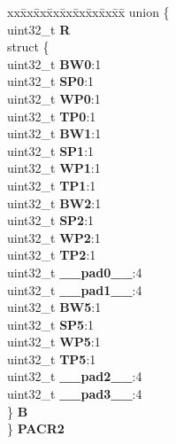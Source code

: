 \begin{DoxyCompactItemize}
\begin{tabbing}
\end{tabbing}\item 
\mbox{\label{structPBRIDGE__B__tag_aef6730ebab74a86ec340a97c2e07ec09}} 
\begin{tabbing}
xx\=xx\=xx\=xx\=xx\=xx\=xx\=xx\=xx\=\kill
union \{\\
\>uint32\_t {\bfseries R}\\
\>struct \{\\
\>\>uint32\_t {\bfseries BW0}:1\\
\>\>uint32\_t {\bfseries SP0}:1\\
\>\>uint32\_t {\bfseries WP0}:1\\
\>\>uint32\_t {\bfseries TP0}:1\\
\>\>uint32\_t {\bfseries BW1}:1\\
\>\>uint32\_t {\bfseries SP1}:1\\
\>\>uint32\_t {\bfseries WP1}:1\\
\>\>uint32\_t {\bfseries TP1}:1\\
\>\>uint32\_t {\bfseries BW2}:1\\
\>\>uint32\_t {\bfseries SP2}:1\\
\>\>uint32\_t {\bfseries WP2}:1\\
\>\>uint32\_t {\bfseries TP2}:1\\
\>\>uint32\_t {\bfseries \_\_pad0\_\_}:4\\
\>\>uint32\_t {\bfseries \_\_pad1\_\_}:4\\
\>\>uint32\_t {\bfseries BW5}:1\\
\>\>uint32\_t {\bfseries SP5}:1\\
\>\>uint32\_t {\bfseries WP5}:1\\
\>\>uint32\_t {\bfseries TP5}:1\\
\>\>uint32\_t {\bfseries \_\_pad2\_\_}:4\\
\>\>uint32\_t {\bfseries \_\_pad3\_\_}:4\\
\>\} {\bfseries B}\\
\} {\bfseries PACR2}\\


\end{tabbing}
\end{DoxyCompactItemize}
